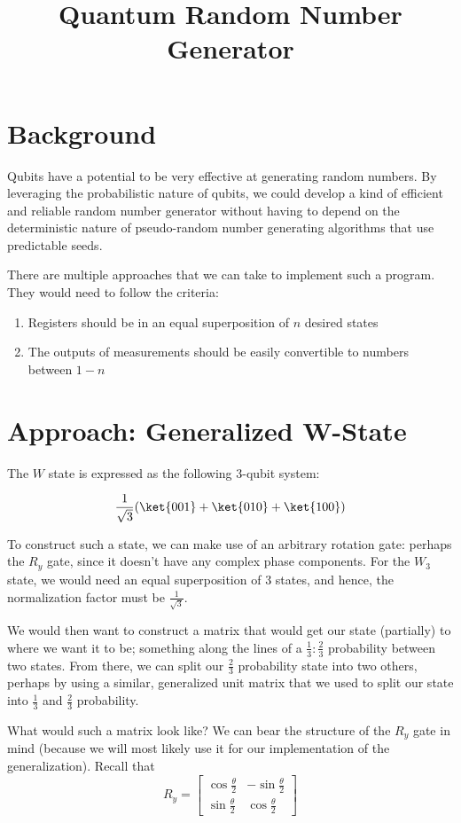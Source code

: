 \documentclass[12pt]{article}
\title{Quantum Random Number Generator}
\begin{document}
\maketitle

\section{Background}
Qubits have a potential to be very effective at generating random numbers. By leveraging the probabilistic nature of qubits, we could develop a kind of efficient and reliable random number generator without having to depend on the deterministic nature of pseudo-random number generating algorithms that use predictable seeds. 

There are multiple approaches that we can take to implement such a program. They would need to follow the criteria:
\begin{enumerate}
    \item Registers should be in an equal superposition of $n$ desired states
    \item The outputs of measurements should be easily convertible to numbers between $1 - n$
\end{enumerate}

\section{Approach: Generalized W-State}
The $W$ state is expressed as the following 3-qubit system:

$$\frac{1}{\sqrt{3}}(\ket{001} + \ket{010} + \ket{100})$$

To construct such a state, we can make use of an arbitrary rotation gate: perhaps the $R_y$ gate, since it doesn't have any complex phase components. For the $W_3$ state, we would need an equal superposition of 3 states, and hence, 
the normalization factor must be $\frac{1}{\sqrt{3}}$. 

We would then want to construct a matrix that would get our state (partially) to where we want it to be; something along the lines of a $\frac{1}{3}:\frac{2}{3}$ probability between two states. From there, we can split our $\frac{2}{3}$ probability state into two others, perhaps by using a similar, generalized unit matrix that we used to split our state into $\frac{1}{3}$ and $\frac{2}{3}$ probability.

What would such a matrix look like? We can bear the structure of the $R_y$ gate in mind (because we will most likely use it for our implementation of the generalization). Recall that 
$$R_y = \begin{bmatrix}
\cos \frac{\theta}{2} & -\sin \frac{\theta}{2} \\ \sin \frac{\theta}{2} & \cos \frac{\theta}{2}
\end{bmatrix}$$
\end{document}
